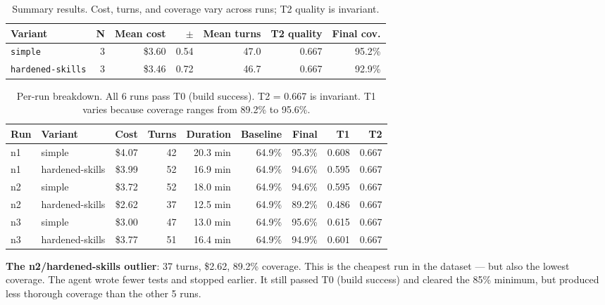 \documentclass[11pt,a4paper]{article}
\begin{document}
\begin{table}[H]
\centering
\renewcommand{\arraystretch}{1.3}
\begin{tabular}{@{}lrrrrrr@{}}
\toprule
\textbf{Variant} & \textbf{N} & \textbf{Mean cost} & \textbf{$\pm$} &
  \textbf{Mean turns} & \textbf{T2 quality} & \textbf{Final cov.} \\
\midrule
\texttt{simple}            & 3 & \$3.60 & 0.54 & 47.0 & 0.667 & 95.2\% \\
\texttt{hardened-skills}   & 3 & \$3.46 & 0.72 & 46.7 & 0.667 & 92.9\% \\
\bottomrule
\end{tabular}
\caption{Summary results. Cost, turns, and coverage vary across runs;
T2 quality is invariant.}
\end{table}

\begin{table}[H]
\centering
\renewcommand{\arraystretch}{1.3}
\begin{tabular}{@{}llrrrrrrr@{}}
\toprule
\textbf{Run} & \textbf{Variant} & \textbf{Cost} & \textbf{Turns} &
  \textbf{Duration} & \textbf{Baseline} & \textbf{Final} & \textbf{T1} & \textbf{T2} \\
\midrule
n1 & simple            & \$4.07 & 42 & 20.3 min & 64.9\% & 95.3\% & 0.608 & 0.667 \\
n1 & hardened-skills   & \$3.99 & 52 & 16.9 min & 64.9\% & 94.6\% & 0.595 & 0.667 \\
n2 & simple            & \$3.72 & 52 & 18.0 min & 64.9\% & 94.6\% & 0.595 & 0.667 \\
n2 & hardened-skills   & \$2.62 & 37 & 12.5 min & 64.9\% & 89.2\% & 0.486 & 0.667 \\
n3 & simple            & \$3.00 & 47 & 13.0 min & 64.9\% & 95.6\% & 0.615 & 0.667 \\
n3 & hardened-skills   & \$3.77 & 51 & 16.4 min & 64.9\% & 94.9\% & 0.601 & 0.667 \\
\bottomrule
\end{tabular}
\caption{Per-run breakdown. All 6 runs pass T0 (build success). T2 = 0.667 is invariant.
T1 varies because coverage ranges from 89.2\% to 95.6\%.}
\end{table}

\begin{notebox}
\textbf{The n2/hardened-skills outlier}: 37 turns, \$2.62, 89.2\% coverage.
This is the cheapest run in the dataset --- but also the lowest coverage.
The agent wrote fewer tests and stopped earlier. It still passed T0 (build success)
and cleared the 85\% minimum, but produced less thorough coverage than the other 5 runs.
\end{notebox}
\end{document}
